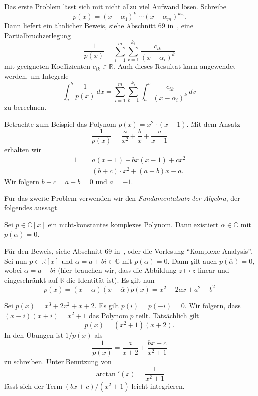 \documentclass[../main.tex]{subfiles}
\begin{document}
Das erste Problem lässt sich mit nicht allzu viel Aufwand lösen.
Schreibe
\[
  p(x) = {(x - \alpha_1)}^{k_1} \cdots
  {(x - \alpha_m)}^{k_m}.
\]
Dann liefert ein ähnlicher Beweis,
siehe Abschnitt 69 in~\cite{heuser},
eine Partialbruchzerlegung
\[
  \frac{1}{p(x)} = \sum_{i=1}^{m} \sum_{k=1}^{k_i} 
  \frac{c_{ik}}{{(x - \alpha_i)}^k}
\]
mit geeigneten Koeffizienten $c_{ik} \in \mathbb{R}$.
Auch dieses Resultat kann angewendet werden,
um Integrale
\[
  \int_{a}^{b} \frac{1}{p(x)} \, dx
  = \sum_{i=1}^{m} \sum_{k=1}^{k_i} \int_{a}^{b} 
  \frac{c_{ik}}{{(x - \alpha_i)}^k}\, dx
\]
zu berechnen.

\begin{example}
  Betrachte zum Beispiel das Polynom
    $p(x) = x^2 \cdot (x - 1)$.
  Mit dem Ansatz
  \[
    \frac{1}{p(x)} = \frac{a}{x^2} + \frac{b}{x}
    + \frac{c}{x-1}
  \]
  erhalten wir
  \begin{align*}
    1 & 
    = a(x - 1) + b x (x - 1) + cx^2\\
      &= (b + c) \cdot x^2 + (a - b) x - a.
  \end{align*}
  Wir folgern $b + c = a - b = 0$ und $a = -1$.
\end{example}
  
Für das zweite Problem verwenden wir den
\emph{Fundamentalsatz der Algebra},
der folgendes aussagt.

\begin{lemma}
  Sei $p \in \mathbb{C}[x]$ ein nicht-konstantes
  komplexes Polynom. Dann existiert $\alpha \in \mathbb{C}$ 
  mit $p( \alpha ) = 0$.
\end{lemma}

Für den Beweis, siehe Abschnitt 69 in~\cite{heuser}, oder
die Vorlesung ``Komplexe Analysis''.
Sei nun $p \in \mathbb{R}[x]$ und $\alpha = a + bi \in \mathbb{C}$ 
mit $p ( \alpha ) = 0$.
Dann gilt auch
$p(\overline \alpha) = 0$,
wobei $\overline \alpha = a - bi$
(hier brauchen wir, dass die Abbildung
$z \mapsto \overline z$ linear
und eingeschränkt auf $\mathbb{R}$ die Identität ist).
Es gilt nun
\[
  p(x) = (x - \alpha)(x - \overline \alpha) \widetilde{p}(x)
  = x^2 - 2ax + a^2 + b^2
\]

\begin{example}
  Sei $p(x) = x^3 + 2x^2 + x + 2$.
  Es gilt $p(i) = p(-i) = 0$.
  Wir folgern, dass $(x- i)(x + i) = x^2 + 1$ 
  das Polynom $p$ teilt. Tatsächlich gilt
  \[
    p(x) = (x^2 + 1)(x+2).
  \]
  In den Übungen ist $1/p(x)$ als
  \[
    \frac{1}{p(x)} = \frac{a}{x + 2}
    + \frac{bx + c}{x^2 + 1}
  \]
  zu schreiben. Unter Benutzung von
  \[
    \arctan'(x) = \frac{1}{x^2 + 1}
  \]
  lässt sich der Term $(bx + c)/(x^2 + 1)$ leicht integrieren.
\end{example}
\end{document}
